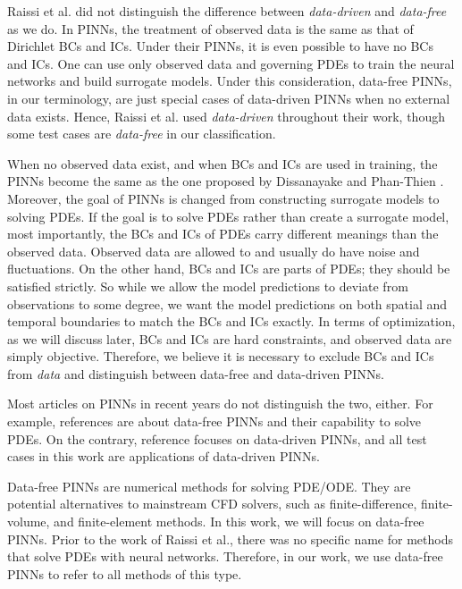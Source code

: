 Raissi et al. did not distinguish the difference between {\it data-driven} and {\it data-free} as we do.
In PINNs, the treatment of observed data is the same as that of Dirichlet BCs and ICs.
Under their PINNs, it is even possible to have no BCs and ICs.
One can use only observed data and governing PDEs to train the neural networks and build surrogate models.
Under this consideration, data-free PINNs, in our terminology, are just special cases of data-driven PINNs when no external data exists.
Hence, Raissi et al. used {\it data-driven} throughout their work, though some test cases are {\it data-free} in our classification.

When no observed data exist, and when BCs and ICs are used in training, the PINNs become the same as the one proposed by Dissanayake and Phan-Thien \cite{dissanayake_neural-network-based_1994}.
Moreover, the goal of PINNs is changed from constructing surrogate models to solving PDEs.
If the goal is to solve PDEs rather than create a surrogate model, most importantly, the BCs and ICs of PDEs carry different meanings than the observed data.
Observed data are allowed to and usually do have noise and fluctuations.
On the other hand, BCs and ICs are parts of PDEs; they should be satisfied strictly.
So while we allow the model predictions to deviate from observations to some degree, we want the model predictions on both spatial and temporal boundaries to match the BCs and ICs exactly.
In terms of optimization, as we will discuss later, BCs and ICs are hard constraints, and observed data are simply objective.
Therefore, we believe it is necessary to exclude BCs and ICs from {\it data} and distinguish between data-free and data-driven PINNs.

Most articles on PINNs in recent years do not distinguish the two, either.
For example, references \cite{wang_understanding_2021,krishnapriyan_characterizing_2021,wang_when_2022} are about data-free PINNs and their capability to solve PDEs.
On the contrary, reference \cite{cai_physics-informed_2021} focuses on data-driven PINNs, and all test cases in this work are applications of data-driven PINNs.

Data-free PINNs are numerical methods for solving PDE/ODE.
They are potential alternatives to mainstream CFD solvers, such as finite-difference, finite-volume, and finite-element methods.
In this work, we will focus on data-free PINNs.
Prior to the work of Raissi et al., there was no specific name for methods that solve PDEs with neural networks.
Therefore, in our work, we use data-free PINNs to refer to all methods of this type.

